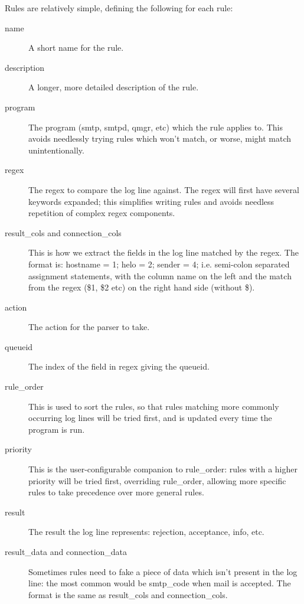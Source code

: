 \documentclass[a4paper,12pt,draft]{article}
\begin{document}
Rules are relatively simple, defining the following for each rule:

\begin{description}

    \item [name] A short name for the rule.

    \item [description] A longer, more detailed description of the rule.

    \item [program] The program (smtp, smtpd, qmgr, etc) which the rule
        applies to.  This avoids needlessly trying rules which won't
        match, or worse, might match unintentionally.

    \item [regex] The regex to compare the log line against.  The regex
        will first have several keywords expanded; this simplifies writing
        rules and avoids needless repetition of complex regex components.

    \item [result\_cols and connection\_cols] This is how we extract the
        fields in the log line matched by the regex.  The format is:
        \newline 
        hostname = 1; helo = 2; sender = 4; \newline
        i.e. semi-colon separated assignment statements, with the column
        name on the left and the match from the regex (\$1, \$2 etc) on the
        right hand side (without \$).

    \item [action] The action for the parser to take.

    \item [queueid] The index of the field in regex giving the queueid.

    \item [rule\_order] This is used to sort the rules, so that rules
        matching more commonly occurring log lines will be tried first, and
        is updated every time the program is run.

    \item [priority] This is the user-configurable companion to
        rule\_order: rules with a higher priority will be tried first,
        overriding rule\_order, allowing more specific rules to take
        precedence over more general rules.

    \item [result]  The result the log line represents: rejection,
        acceptance, info, etc.

    \item [result\_data and connection\_data] Sometimes rules need to fake
        a piece of data which isn't present in the log line: the most
        common would be smtp\_code when mail is accepted.  The format is
        the same as result\_cols and connection\_cols.

\end{description}
\end{document}

